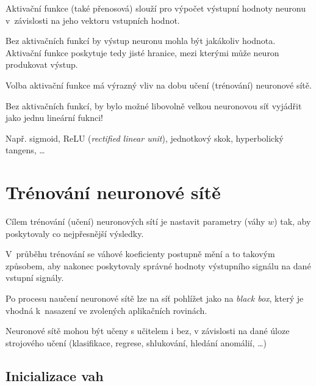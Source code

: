 \begin{compactitem}
    \item Aktivační funkce (také přenosová) slouží pro výpočet výstupní hodnoty neuronu v~závislosti na jeho vektoru vstupních hodnot.

    \item Bez aktivačních funkcí by výstup neuronu mohla být jakákoliv hodnota. Aktivační funkce poskytuje tedy jisté hranice, mezi kterými může neuron produkovat výstup.

    \item Volba aktivační funkce má výrazný vliv na dobu učení (trénování) neuronové sítě.

    \item Bez aktivačních funkcí, by bylo možné libovolně velkou neuronovou síť vyjádřit jako jednu lineární fuknci!

    \item Např. sigmoid, ReLU (\textit{rectified linear unit}), jednotkový skok, hyperbolický tangens, \dots
\end{compactitem}


\section{Trénování neuronové sítě}

\begin{compactitem}
    \item Cílem trénování (učení) neuronových sítí je nastavit parametry (váhy $w$) tak, aby poskytovaly co nejpřesnější výsledky.

    \item V~průběhu trénování se váhové koeficienty postupně mění a to takovým způsobem, aby nakonec poskytovaly správné hodnoty výstupního signálu na dané vstupní signály.

    \item Po procesu naučení neuronové sítě lze na síť pohlížet jako na \textit{black box}, který je vhodná k~nasazení ve zvolených aplikačních rovinách.

    \item Neuronové sítě mohou být učeny s učitelem i bez, v závislosti na dané úloze strojového učení (klasifikace, regrese, shlukování, hledání anomálií, \dots)
\end{compactitem}

\subsection{Inicializace vah}

